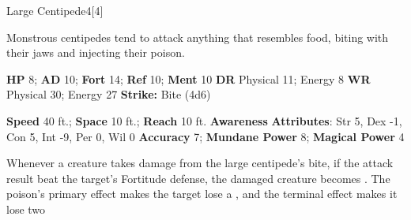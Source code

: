   \begin{monsection}{Large Centipede}{4}[4]
    \vspace{-1em}\vspace{-1em}
    \vspace{0em}

    
    Monstrous centipedes tend to attack anything that resembles food, biting with their jaws and injecting their poison.
  

    \begin{spellcontent}
      \begin{spelltargetinginfo}
        \pari \textbf{HP} 8;
          \textbf{AD} 10;
          \textbf{Fort} 14;
          \textbf{Ref} 10;
          \textbf{Ment} 10
        \pari \textbf{DR} Physical 11; Energy 8
        \pari \textbf{WR} Physical 30; Energy 27
        \pari \textbf{Strike:}
            Bite  (4d6)
      \end{spelltargetinginfo}
    \end{spellcontent}
    \begin{monsterfooter}
      \pari \textbf{Speed} 40 ft.;
        \textbf{Space} 10 ft.;
        \textbf{Reach} 10 ft.
      \pari \textbf{Awareness} 
      \pari \textbf{Attributes}:
        Str 5, Dex -1,
        Con 5, Int -9,
        Per 0, Wil 0
      \pari \textbf{Accuracy} 7;
        \textbf{Mundane Power} 8;
      \textbf{Magical Power} 4
    \end{monsterfooter}
  \end{monsection}
    Whenever a creature takes damage from the large centipede's bite,
      if the attack result beat the target's Fortitude defense,
      the damaged creature becomes .
    The poison's primary effect makes the target lose a , and the terminal effect makes it lose two 
  
